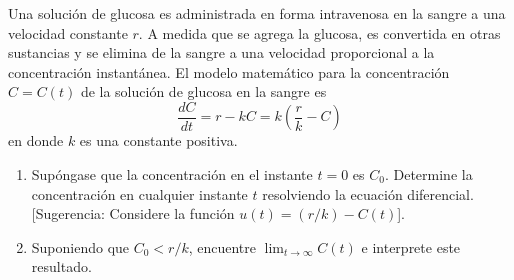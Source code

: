 \item Una solución de glucosa es administrada en forma intravenosa en la sangre a una velocidad constante $r$. A medida que se agrega la glucosa, es convertida en otras sustancias y se elimina de la sangre a una velocidad proporcional a la concentración instantánea. El modelo matemático para la concentración $C = C(t)$ de la solución de glucosa en la sangre es
    \[ \frac{dC}{dt} = r - kC = k\left(\frac{r}{k} - C\right) \]
    en donde $k$ es una constante positiva.
    \begin{enumerate}
        \item[(a)] Supóngase que la concentración en el instante $t = 0$ es $C_0$. Determine la concentración en cualquier instante $t$ resolviendo la ecuación diferencial. [Sugerencia: Considere la función $u(t) = (r/k) - C(t)$].
        \item[(b)] Suponiendo que $C_0 < r/k$, encuentre $\lim_{t \to \infty} C(t)$ e interprete este resultado.
    \end{enumerate}

